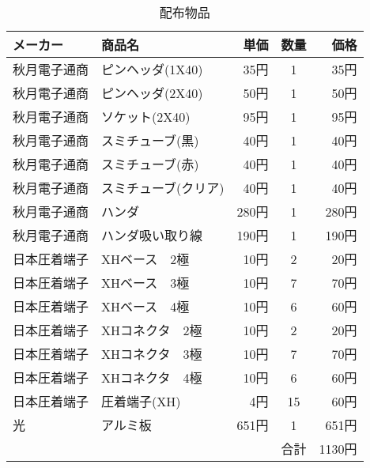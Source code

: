 \begin{table}[H]
 \begin{center}
  \caption{配布物品}
  \label{tab:list1}
  \begin{tabular}{|l|l|r|c|r|}  \hline
   メーカー & 商品名 & 単価 & 数量 & 価格 \\ \hline \hline 
   秋月電子通商 & ピンヘッダ(1X40) & 35円 & 1 & 35円  \\     \hline
   秋月電子通商 & ピンヘッダ(2X40) & 50円 & 1 & 50円  \\     \hline   
   秋月電子通商 & ソケット(2X40) & 95円 & 1 & 95円  \\     \hline
   秋月電子通商 & スミチューブ(黒) & 40円 & 1 & 40円 \\ \hline
   秋月電子通商 & スミチューブ(赤) & 40円 & 1 & 40円 \\ \hline
   秋月電子通商 & スミチューブ(クリア) & 40円 & 1 & 40円 \\ \hline
   秋月電子通商 & ハンダ & 280円 & 1 & 280円 \\ \hline
   秋月電子通商 & ハンダ吸い取り線 & 190円 & 1 & 190円 \\ \hline
   日本圧着端子 & XHベース　2極  & 10円 & 2 & 20円  \\     \hline
   日本圧着端子 & XHベース　3極  & 10円 & 7 & 70円  \\     \hline
   日本圧着端子 & XHベース　4極  & 10円 & 6 & 60円  \\     \hline
   日本圧着端子 & XHコネクタ　2極  & 10円 & 2 & 20円  \\     \hline
   日本圧着端子 & XHコネクタ　3極  & 10円 & 7 & 70円  \\     \hline
   日本圧着端子 & XHコネクタ　4極  & 10円 & 6 & 60円  \\     \hline
   日本圧着端子 & 圧着端子(XH)  & 4円 & 15 & 60円  \\     \hline
   光 & アルミ板 & 651円& 1& 651円\\ \hline
   &  & &合計 & 1130円  \\   \hline
  \end{tabular}
 \end{center}
\end{table}

\newpage

